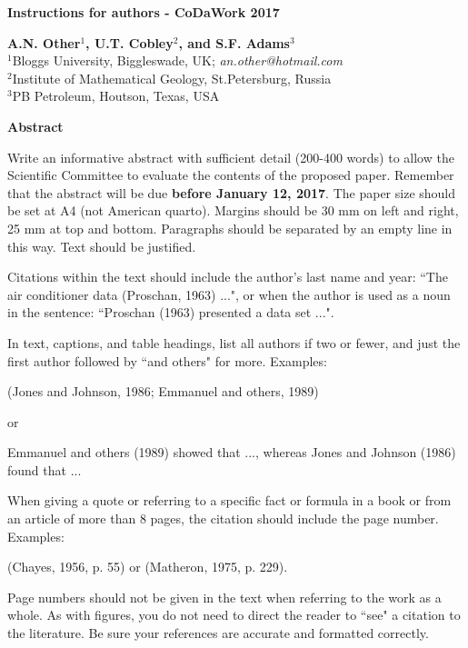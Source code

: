\documentclass [10pt]{article}\usepackage[]{graphicx}\usepackage[]{color}
\begin{document}
\begin{center}
\textbf{\large Instructions for authors - CoDaWork 2017}

\vskip 0.25cm

\textbf{A.N. Other}$^{1}$\textbf{, U.T. Cobley}$^{2}$\textbf{, and
S.F. Adams}$^{3}$ \\
{\small $^{1}$Bloggs University, Biggleswade,
UK;
\textit{an.other@hotmail.com} \\
$^{2}$Institute of Mathematical Geology, St.Petersburg, Russia \\
$^{3}$PB Petroleum, Houtson, Texas, USA}
\end{center}

\vskip 0.5cm {\centerline{\bf Abstract}}

Write an informative abstract with sufficient detail (200-400 words) to allow the Scientific Committee to evaluate the contents of the proposed paper. Remember that the abstract will be due {\bf before January 12, 2017}. The paper size should be set at A4 (not American quarto).
Margins should be 30 mm on left and right, 25 mm at top and bottom. Paragraphs should be
separated by an empty line in this way. Text should be justified.

Citations within the text should include the
author's last name and year: ``The air conditioner data (Proschan,
1963) ...", or when the author is used as a noun in the sentence:
``Proschan (1963) presented a data set ...".

In text, captions, and table headings, list all authors if two or
fewer, and just the first author followed by ``and others" for
more. Examples:

\begin{center}
(Jones and Johnson, 1986; Emmanuel and others, 1989)
\end{center}
or
\begin{center}
Emmanuel and others (1989) showed that ..., whereas Jones and
Johnson (1986) found that ...
\end{center}

When giving a quote or referring to a specific fact or formula in
a book or from an article of more than 8 pages, the citation
should include the page number. Examples:

\begin{center}
(Chayes, 1956, p. 55) or (Matheron, 1975, p. 229).
\end{center}

Page numbers should not be given in the text when referring to the
work as a whole. As with figures, you do not need to direct the
reader to ``see" a citation to the literature. Be sure your
references are accurate and formatted correctly.
\end{document}
